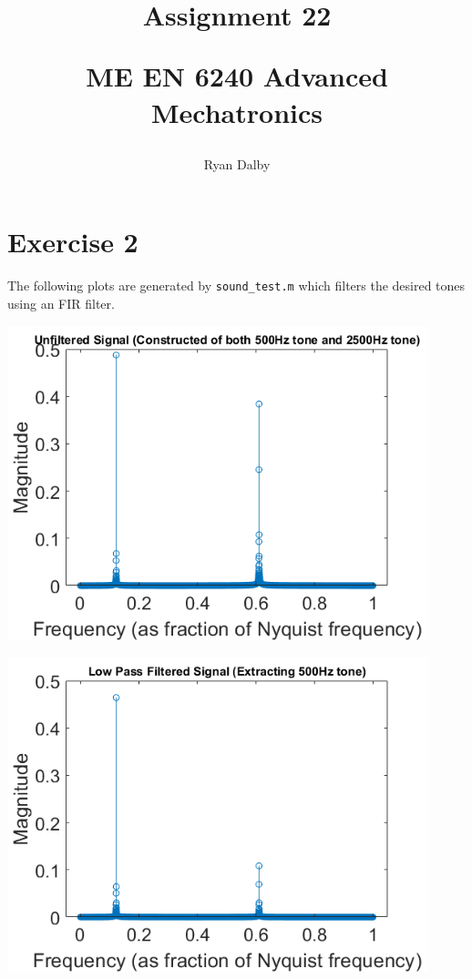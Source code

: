 \documentclass[12pt]{article}
\title{
    Assignment 22

    \large{
        ME EN 6240 Advanced Mechatronics
    }  
}
\author{
        Ryan Dalby
}
\date{\displaydate{date}}
\begin{document}
\maketitle

\section*{Exercise 2}

The following plots are generated by \verb|sound_test.m| which filters the desired tones using an FIR filter.
\begin{center}
    \includegraphics[width=4.8in]{unfiltered.png}

    \includegraphics[width=4.8in]{lowpass_fir.png}


\end{center}
\end{document}
